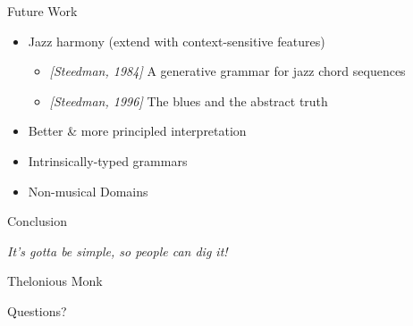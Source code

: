 \documentclass[aspectratio=43]{beamer}
\begin{document}
\begin{frame}{Future Work}
\begin{itemize}
\item Jazz harmony (extend with context-sensitive features)
  \begin{itemize}
  \item \textit{[Steedman, 1984]} A generative grammar for jazz chord sequences
  \item \textit{[Steedman, 1996]} The blues and the abstract truth
  \end{itemize}
\item Better \& more principled interpretation
\item Intrinsically-typed grammars
\item Non-musical Domains
\end{itemize}
\end{frame}

\begin{frame}{Conclusion}
\setlength{\epigraphwidth}{.5\linewidth}
\epigraph{\textit{It's gotta be simple, so people can dig it!}}{Thelonious Monk}
\end{frame}

\begin{frame}[standout]
  Questions?
\end{frame}
\end{document}
